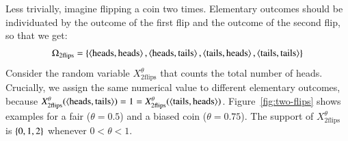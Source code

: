\documentclass[nobib,nofonts]{tufte-handout}
\begin{document}
\begin{example}
  Less trivially, imagine flipping a coin two times. Elementary outcomes should be individuated by the outcome of the first flip and the outcome of the second flip, so that we get:
  \begin{align*}
    \Omega_{\text{2flips}} = \left\{\left \langle \text{heads}, \text{heads}\right\rangle, \left \langle \text{heads}, \text{tails}\right\rangle,
    \left \langle \text{tails}, \text{heads}\right\rangle, \left \langle \text{tails}, \text{tails}\right\rangle\right\}
  \end{align*}
  Consider the random variable $X_{\text{2flips}}^{\theta}$ that counts the total number of heads.
  Crucially, we assign the same numerical value to different elementary outcomes, because $X_{\text{2flips}}^{\theta}(\left \langle \text{heads}, \text{tails}\right\rangle) = 1 = X_{\text{2flips}}^{\theta}(\left \langle \text{tails}, \text{heads}\right\rangle)$.
  Figure~\ref{fig:two-flips} shows examples for a fair ($\theta = 0.5$) and a biased coin ($\theta=0.75$).
  The support of $X_{\text{2flips}}^{\theta}$ is $\left\{0,1,2\right\}$ whenever $0 < \theta < 1$.

  \begin{figure}
  \centering
  \twoFlips

  \hfill


\end{figure}
\end{example}
\end{document}
